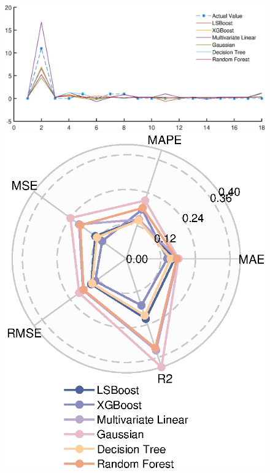 \documentclass{mcmthesis}
\begin{document}
\begin{figure}[!htbp]
    \centering
    \begin{minipage}[t]{0.58\textwidth}
        \centering
        \includegraphics[width=\textwidth, keepaspectratio]{pics/multi-regression-compare-3.eps}
    \end{minipage}
    \hfill
    \begin{minipage}[t]{0.4\textwidth}
        \centering
        \includegraphics[width=\textwidth, keepaspectratio]{pics/multi-regression-compare-5.eps}
    \end{minipage}
    

\end{figure}
\end{document}
